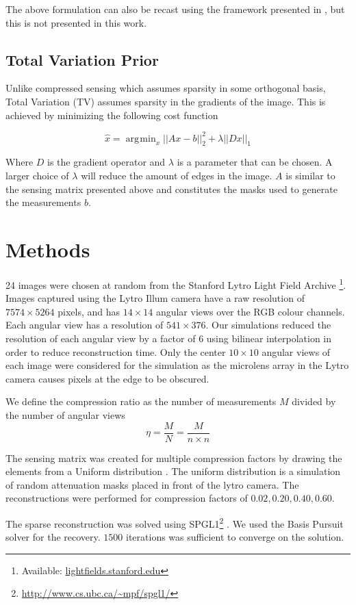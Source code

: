 \documentclass[10pt,twocolumn,letterpaper]{article}
\DeclareMathOperator*{\argmin}{\arg\!\min}
\begin{document}
The above formulation can also be recast using the framework presented in \cite{GordonArticle2}, but this is not presented in this work.

\subsection{Total Variation Prior}

Unlike compressed sensing which assumes sparsity in some orthogonal basis, Total Variation (TV) assumes sparsity in the gradients of the image. This is achieved by minimizing the following cost function

\[ \hat{x} = \argmin_x ||Ax - b||^2_2 + \lambda ||D x||_1 \]

Where $D$ is the gradient operator and $\lambda$ is a parameter that can be chosen. A larger choice of $\lambda$ will reduce the amount of edges in the image. $A$ is similar to the sensing matrix presented above and constitutes the masks used to generate the measurements $b$.

\section{Methods}


24 images were chosen at random from the Stanford Lytro Light Field Archive \footnote{Available: \url{lightfields.stanford.edu}}. Images captured using the Lytro Illum camera have a raw resolution of $7574 \times 5264$ pixels, and has $14 \times 14$ angular views over the RGB colour channels. Each angular view has a resolution of $541 \times 376$. Our simulations reduced the resolution of each angular view by a factor of $6$ using bilinear interpolation in order to reduce reconstruction time. Only the center $10 \times 10$ angular views of each image were considered for the simulation as the microlens array in the Lytro camera causes pixels at the edge to be obscured.


We define the compression ratio as the number of measurements $M$ divided by the number of angular views \[ \eta = \frac{M}{N} = \frac{M}{n \times n}\]

The sensing matrix was created for multiple compression factors by drawing the elements from a Uniform distribution \cite{Rauhut11}. The uniform distribution is a simulation of random attenuation masks placed in front of the lytro camera. The reconstructions were performed for compression factors of $0.02, 0.20, 0.40, 0.60$.

The sparse reconstruction was solved using SPGL1\footnote{\url{http://www.cs.ubc.ca/~mpf/spgl1/}} \cite{BasisPursuit1}\cite{BasisPursuit2}. We used the Basis Pursuit solver for the recovery. $1500$ iterations was sufficient to converge on the solution.
\end{document}
